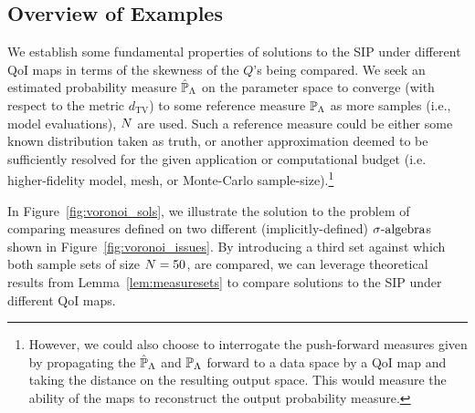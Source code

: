 \subsection{Overview of Examples}
We establish some fundamental properties of solutions to the SIP under different QoI maps in terms of the skewness of the $Q$'s being compared.
We seek an estimated probability measure $\hat{\mathbb{P}}_{\Lambda}$ on the parameter space to converge (with respect to the metric $d_\text{TV}$) to some reference measure $\mathbb{P}_{\Lambda}$ as more samples (i.e., model evaluations), $N$ are used.
Such a reference measure could be either some known distribution taken as truth, or another approximation deemed to be sufficiently resolved for the given application or computational budget (i.e. higher-fidelity model, mesh, or Monte-Carlo sample-size).\footnote{However, we could also choose to interrogate the push-forward measures given by propagating the $\hat{\mathbb{P}}_{\Lambda}$ and $\mathbb{P}_{\Lambda}$ forward to a data space by a QoI map and taking the distance on the resulting output space.
This would measure the ability of the maps to reconstruct the output probability measure.}

In Figure~\ref{fig:voronoi_sols}, we illustrate the solution to the problem of comparing measures defined on two different (implicitly-defined) $\sigma\text{-algebra}$s shown in Figure~\ref{fig:voronoi_issues}.
By introducing a third set against which both sample sets of size $N=50$, are compared, we can leverage theoretical results from Lemma~\ref{lem:measuresets} to compare solutions to the SIP under different QoI maps.

